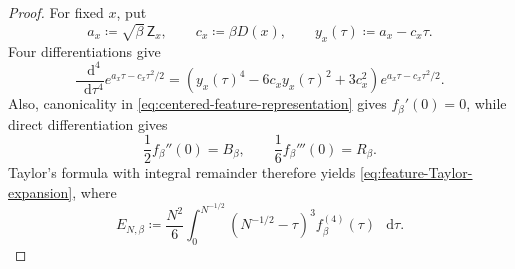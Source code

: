 \documentclass[11pt,reqno]{amsart}
\numberwithin{equation}{section}
\theoremstyle{plain}
\theoremstyle{definition}
\newcommand{\dd}{\mathop{}\!\mathrm d}
\newcommand{\be}{\beta}
\begin{document}
\begin{proof}
For fixed $x$, put
\begin{equation}
 a_x\coloneqq\sqrt\be\,\mathsf Z_x,
 \qquad
 c_x\coloneqq\be D(x),
 \qquad
 y_x(\tau)\coloneqq a_x-c_x\tau.
 \label{eq:feature-derivative-data}
\end{equation}
Four differentiations give
\begin{equation}
 \frac{\dd^4}{\dd\tau^4}
 e^{a_x\tau-c_x\tau^2/2}
 =\left(y_x(\tau)^4-6c_xy_x(\tau)^2+3c_x^2\right)
 e^{a_x\tau-c_x\tau^2/2}.
 \label{eq:feature-fourth-derivative}
\end{equation}
Also, canonicality in \eqref{eq:centered-feature-representation} gives $f_{\be}'(0)=0$, while direct differentiation gives
\begin{equation}
 \frac12f_{\be}''(0)=B_{\be},
 \qquad
 \frac16f_{\be}'''(0)=R_{\be}.
 \label{eq:feature-second-third-derivatives}
\end{equation}
Taylor's formula with integral remainder therefore yields \eqref{eq:feature-Taylor-expansion}, where
\begin{equation}
 E_{N,\be}
 \coloneqq\frac{N^2}{6}
 \int_0^{N^{-1/2}}(N^{-1/2}-\tau)^3
 f_{\be}^{(4)}(\tau)\,\dd\tau.
 \label{eq:feature-remainder-definition}
\end{equation}


\end{proof}
\end{document}
